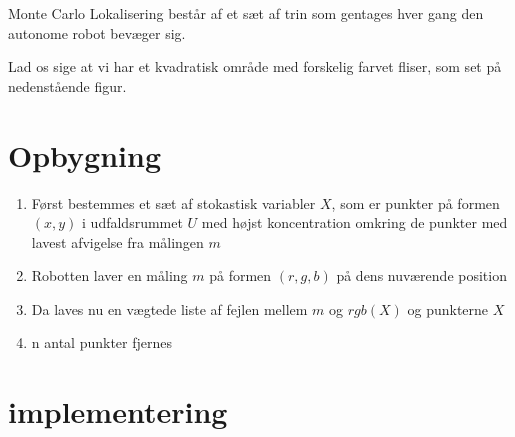 \documentclass[../../SRP.tex]{subfiles}
\begin{document}
Monte Carlo Lokalisering består af et sæt af trin som gentages hver gang den autonome robot bevæger sig. 

Lad os sige at vi har et kvadratisk område med forskelig farvet fliser, som set på nedenstående figur. \\

\section{Opbygning}

\begin{enumerate}
  \item Først bestemmes et sæt af stokastisk variabler $X$, som er punkter på formen $(x,y)$ i udfaldsrummet $U$ med højst koncentration omkring de punkter med lavest afvigelse fra målingen $m$

  \item Robotten laver en måling $m$ på formen $(r,g,b)$ på dens nuværende position

  \item Da laves nu en vægtede liste af fejlen mellem $m$ og $rgb(X)$ og punkterne $X$

  \item n antal punkter fjernes
\end{enumerate}

\section{implementering}
\end{document}
